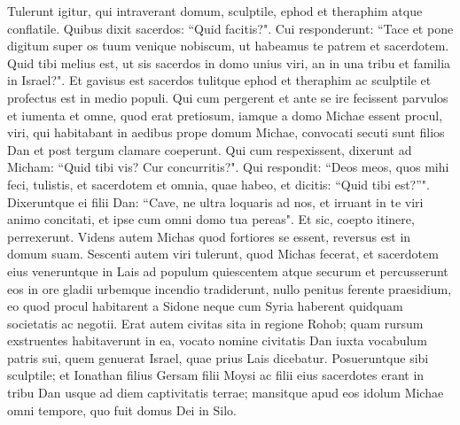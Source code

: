 \begin{biblechapter}
\verse Tulerunt igitur, qui intraverant domum, sculptile, ephod et theraphim atque conflatile. Quibus dixit sacerdos: “Quid facitis?". 
\verse Cui responderunt: “Tace et pone digitum super os tuum venique nobiscum, ut habeamus te patrem et sacerdotem. Quid tibi melius est, ut sis sacerdos in domo unius viri, an in una tribu et familia in Israel?". 
\verse Et gavisus est sacerdos tulitque ephod et theraphim ac sculptile et profectus est in medio populi. 
\verse Qui cum pergerent et ante se ire fecissent parvulos et iumenta et omne, quod erat pretiosum, 
\verse iamque a domo Michae essent procul, viri, qui habitabant in aedibus prope domum Michae, convocati secuti sunt filios Dan 
\verse et post tergum clamare coeperunt. Qui cum respexissent, dixerunt ad Micham: “Quid tibi vis? Cur concurritis?". 
\verse Qui respondit: “Deos meos, quos mihi feci, tulistis, et sacerdotem et omnia, quae habeo, et dicitis: “Quid tibi est?”".  
\verse Dixeruntque ei filii Dan: “Cave, ne ultra loquaris ad nos, et irruant in te viri animo concitati, et ipse cum omni domo tua pereas". 
\verse Et sic, coepto itinere, perrexerunt. Videns autem Michas quod fortiores se essent, reversus est in domum suam. 
\verse Sescenti autem viri tulerunt, quod Michas fecerat, et sacerdotem eius veneruntque in Lais ad populum quiescentem atque securum et percusserunt eos in ore gladii urbemque incendio tradiderunt, 
\verse nullo penitus ferente praesidium, eo quod procul habitarent a Sidone neque cum Syria haberent quidquam societatis ac negotii. Erat autem civitas sita in regione Rohob; quam rursum exstruentes habitaverunt in ea, 
\verse vocato nomine civitatis Dan iuxta vocabulum patris sui, quem genuerat Israel, quae prius Lais dicebatur. 
\verse Posueruntque sibi sculptile; et Ionathan filius Gersam filii Moysi ac filii eius sacerdotes erant in tribu Dan usque ad diem captivitatis terrae; 
\verse mansitque apud eos idolum Michae omni tempore, quo fuit domus Dei in Silo. 
\end{biblechapter}

